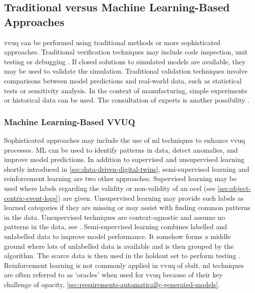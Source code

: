\subsection{Traditional versus Machine Learning-Based Approaches}
\label{sec:ml-approaches}

\gls{vvuq} can be performed using traditional methods or more sophisticated approaches. Traditional verification techniques may include code inspection, unit testing or debugging \autocite{maniaci2018verification}. If closed solutions to simulated models are available, they may be used to validate the simulation. Traditional validation techniques involve comparisons between model predictions and real-world data, such as statistical tests or sensitivity analysis. In the context of manufacturing, simple experiments or historical data can be used. The consultation of experts is another possibility \autocite{shao2023credibility}.

\subsubsection*{Machine Learning-Based VVUQ}

Sophisticated approaches may include the use of \gls{ml} techniques to enhance \gls{vvuq} processes. ML can be used to identify patterns in data, detect anomalies, and improve model predictions. In addition to supervised and unsupervised learning shortly introduced in \autoref{sec:data-driven-digital-twins}, semi-supervised learning and reinforcement learning are two other approaches. Supervised learning may be used where labels regarding the validity or non-validity of an \gls{ocel} (see \autoref{sec:object-centric-event-logs}) are given. Unsupervised learning may provide such labels as learned categories if they are missing or may assist with finding common patterns in the data. Unsupervised techniques are context-agnostic and assume no patterns in the data, see \textcite{hastie2009unsupervised}. Semi-supervised learning combines labelled and unlabelled data to improve model performance. It somehow forms a middle ground where lots of unlabelled data is available and is then grouped by the algorithm. The scarce data is then used in the holdout set to perform testing \autocite{learning2006semi}. Reinforcement learning is not commonly applied in \gls{vvuq} of \gls{sbdt}.
\gls{ml} techniques are often referred to as `oracles' when used for \gls{vvuq} because of their key challenge of opacity, \autoref{sec:requirements-automatically-generated-models}.

